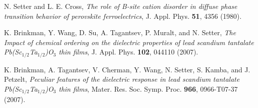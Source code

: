 \documentclass[%
 preprint, %
 amsmath,amssymb,
 aps, physrev,
]{revtex4-2}
\begin{document}
\begin{thebibliography}{99}
 N. Setter and L. E. Cross, {\it The role of B-site cation disorder in diffuse phase transition behavior of perovskite ferroelectrics}, J. Appl. Phys. {\bf 51}, 4356 (1980).

 K. Brinkman, Y. Wang, D. Su, A. Tagantsev, P. Muralt, and N. Setter, {\it The Impact of chemical ordering on the dielectric properties of lead scandium tantalate Pb(Sc$_{1/2}$Ta$_{1/2}$)O$_3$ thin films}, J. Appl. Phys. {\bf 102}, 044110 (2007).

 K. Brinkman, A. Tagantsev, V. Cherman, Y. Wang, N. Setter, S. Kamba, and J. Petzelt, {\it Peculiar features of the dielectric response in lead scandium tantalate Pb(Sc$_{1/2}$Ta$_{1/2}$)O$_3$ thin films}, Mater. Res. Soc. Symp. Proc. {\bf 966}, 0966-T07-37 (2007).

\end{thebibliography}

\end{document}
